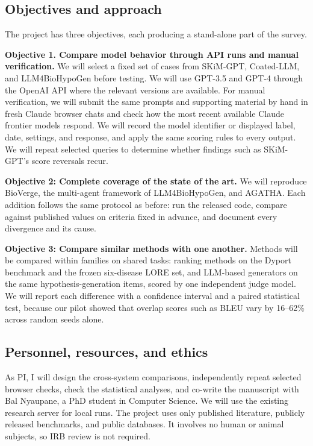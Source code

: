 \documentclass[11pt]{article}
\begin{document}
\subsection*{Objectives and approach}

The project has three objectives, each producing a stand-alone part of the survey.

\textbf{Objective 1. Compare model behavior through API runs and manual verification.} We will select a fixed set of cases from SKiM-GPT, Coated-LLM, and LLM4BioHypoGen before testing. We will use GPT-3.5 and GPT-4 through the OpenAI API where the relevant versions are available. For manual verification, we will submit the same prompts and supporting material by hand in fresh Claude browser chats and check how the most recent available Claude frontier models respond. We will record the model identifier or displayed label, date, settings, and response, and apply the same scoring rules to every output. We will repeat selected queries to determine whether findings such as SKiM-GPT's score reversals recur.

\textbf{Objective 2: Complete coverage of the state of the art.} We will reproduce BioVerge, the multi-agent framework of LLM4BioHypoGen, and AGATHA. Each addition follows the same protocol as before: run the released code, compare against published values on criteria fixed in advance, and document every divergence and its cause.

\textbf{Objective 3: Compare similar methods with one another.} Methods will be compared within families on shared tasks: ranking methods on the Dyport benchmark and the frozen six-disease LORE set, and LLM-based generators on the same hypothesis-generation items, scored by one independent judge model. We will report each difference with a confidence interval and a paired statistical test, because our pilot showed that overlap scores such as BLEU vary by 16--62\% across random seeds alone.

\subsection*{Personnel, resources, and ethics}

As PI, I will design the cross-system comparisons, independently repeat selected browser checks, check the statistical analyses, and co-write the manuscript with Bal Nyaupane, a PhD student in Computer Science. We will use the existing research server for local runs. The project uses only published literature, publicly released benchmarks, and public databases. It involves no human or animal subjects, so IRB review is not required.
\end{document}
